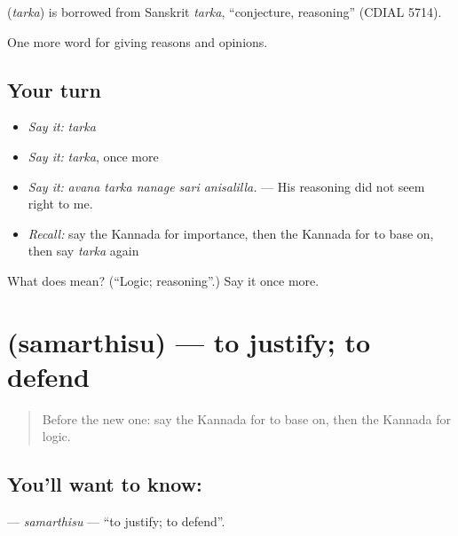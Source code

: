 \begin{cousinweb}
\textbf{} (\emph{tarka}) is borrowed from Sanskrit \emph{tarka}, \textquotedblleft{}conjecture, reasoning\textquotedblright{} (CDIAL 5714).
\end{cousinweb}

\begin{grammarlens}[title={What you've built}]
One more word for giving reasons and opinions.
\end{grammarlens}

\subsection*{Your turn}
\begin{itemize}
\raggedright
  \item \emph{Say it:} \emph{tarka}
  \item \emph{Say it:} \emph{tarka}, once more
  \item \emph{Say it:} \emph{avana tarka nanage sari anisalilla.} — His reasoning did not seem right to me.
  \item \emph{Recall:} say the Kannada for importance, then the Kannada for to base on, then say \emph{tarka} again
\end{itemize}

\begin{tcolorbox}[breakable,colback=teal!4,colframe=teal!35!black,title={Before you move on}]
What does  mean? (\textquotedblleft{}Logic; reasoning\textquotedblright{}.) Say it once more.
\end{tcolorbox}
\section[\texorpdfstring{\kn{ಸಮರ್ಥಿಸು} (samarthisu)}{ಸಮರ್ಥಿಸು (samarthisu)}]{ (samarthisu) — to justify; to defend}

\label{lesson:KA-C377-samarthisu}



\begin{quote}
Before the new one: say the Kannada for to base on, then the Kannada for logic.
\end{quote}

\subsection*{You'll want to know: }
\textbf{} — \emph{samarthisu} — \textquotedblleft{}to justify; to defend\textquotedblright{}.


